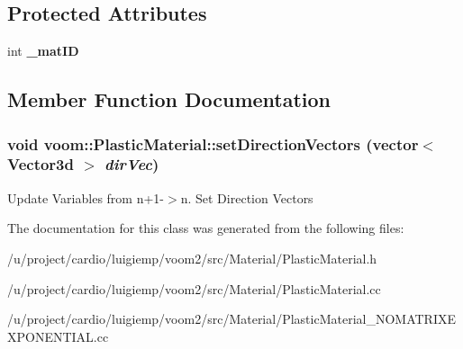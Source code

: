 \subsection*{Protected Attributes}
\begin{DoxyCompactItemize}
\item 
\hypertarget{classvoom_1_1_plastic_material_a60a9f68ef337b748c6e147b7259d3740}{
int {\bfseries \_\-matID}}
\label{classvoom_1_1_plastic_material_a60a9f68ef337b748c6e147b7259d3740}

\end{DoxyCompactItemize}


\subsection{Member Function Documentation}
\hypertarget{classvoom_1_1_plastic_material_adeed31ed97955b441efa8beeb56ce7e1}{
\subsubsection[{setDirectionVectors}]{\setlength{\rightskip}{0pt plus 5cm}void voom::PlasticMaterial::setDirectionVectors (vector$<$ Vector3d $>$ {\em dirVec})}}
\label{classvoom_1_1_plastic_material_adeed31ed97955b441efa8beeb56ce7e1}


Update Variables from n+1-\/$>$n. Set Direction Vectors 

The documentation for this class was generated from the following files:\begin{DoxyCompactItemize}
\item 
/u/project/cardio/luigiemp/voom2/src/Material/PlasticMaterial.h\item 
/u/project/cardio/luigiemp/voom2/src/Material/PlasticMaterial.cc\item 
/u/project/cardio/luigiemp/voom2/src/Material/PlasticMaterial\_\-NOMATRIXEXPONENTIAL.cc\end{DoxyCompactItemize}
